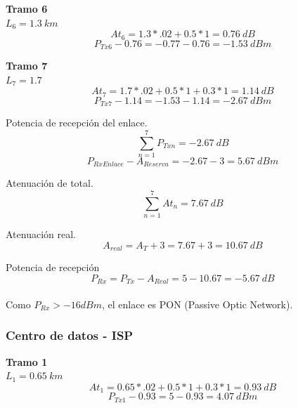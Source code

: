 \documentclass[12pt,letterpaper]{article}
\begin{document}
\textbf{Tramo 6} \\
$L_6=1.3 \ km$
\\
\begin{equation}
    At_6=1.3*.02+0.5*1=0.76 \ dB
\end{equation}
\begin{equation}
    P_{Tx6}-0.76=-0.77-0.76=-1.53 \ dBm
\end{equation}

\textbf{Tramo 7} \\
$L_7=1.7$
\\ 
\begin{equation}
    At_7=1.7*.02+0.5*1+0.3*1=1.14 \ dB
\end{equation}
\begin{equation}
    P_{Tx7}-1.14=-1.53-1.14=-2.67 \ dBm
\end{equation}

Potencia de recepción del enlace.
\begin{equation}
    \sum_{n=1}^{7} P_{Txn} = -2.67 \ dB
\end{equation}
\begin{equation}
    P_{RxEnlace}-A_{Reserva}=-2.67-3=5.67 \ dBm
\end{equation}

Atenuación de total.
\begin{equation}
    \sum_{n=1}^{7} At_n = 7.67 \ dB
\end{equation}

Atenuación real.
\begin{equation}
    A_{real}=A_T+3=7.67+3=10.67 \ dB
\end{equation}

Potencia de recepción
\begin{equation}
    P_{Rx}=P_{Tx}-A_{Real}=5-10.67=-5.67 \ dB
\end{equation}
\\
Como $P_{Rx}>-16dBm$, el enlace es PON (Passive Optic Network).

\newpage
\subsubsection{Centro de datos - ISP}
\textbf{Tramo 1} \\
$L_1=0.65 \ km$
\\
\begin{equation}
    At_1=0.65*.02+0.5*1+0.3*1=0.93 \ dB
\end{equation}
\begin{equation}
    P_{Tx1}-0.93=5-0.93=4.07 \ dBm
\end{equation}
\end{document}

